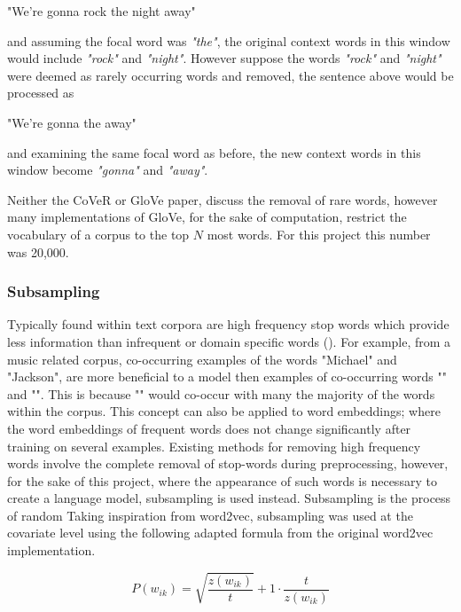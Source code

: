 \begin{center}
	"We're gonna rock the night away"
\end{center}

\noindent
and assuming the focal word was \textit{"the"}, the original context words in this window would include \textit{"rock"} and \textit{"night"}. However suppose the words \textit{"rock"} and \textit{"night"} were deemed as rarely occurring words and removed, the sentence above would be processed as 

\begin{center}
	"We're gonna the away"
\end{center}
\noindent
and examining the same focal word as before, the new context words in this window become \textit{"gonna"} and \textit{"away"}.

\noindent
\newline
Neither the CoVeR or GloVe paper, discuss the removal of rare words, however many implementations of GloVe, for the sake of computation, restrict the vocabulary of a corpus to the top \(N\) most words. For this project this number was 20,000.
\subsubsection{Subsampling}
Typically found within text corpora are high frequency stop words which provide less information than infrequent or domain specific words (\cite{Mikolov2013a}). For example, from a music related corpus, co-occurring examples of the words "Michael" and "Jackson", are more beneficial to a model then examples of co-occurring words "" and "". This is because "" would co-occur with many the majority of the words within the corpus. This concept can also be applied to word embeddings; where the word embeddings of frequent words does not change significantly after training on several examples.
Existing methods for removing high frequency words involve the complete removal of stop-words during preprocessing, however, for the sake of this project, where the appearance of such words is necessary to create a language model, subsampling is used instead. Subsampling is the process of random  Taking inspiration from word2vec, subsampling was used at the covariate level using the following adapted formula from the original word2vec implementation.

\begin{equation}
P(w_{ik}) = \sqrt{\dfrac{z(w_{ik})}{t}} + 1 \cdot \dfrac{t}{z(w_{ik})}
\end{equation}

